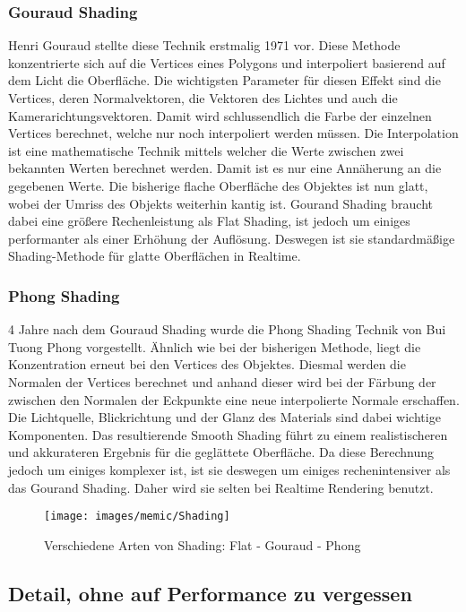 \subsubsection{Gouraud Shading}

Henri Gouraud stellte diese Technik erstmalig 1971 vor. Diese Methode konzentrierte sich auf die Vertices eines Polygons und interpoliert basierend auf dem Licht die Oberfläche. Die wichtigsten Parameter für diesen Effekt sind die Vertices, deren Normalvektoren, die Vektoren des Lichtes und auch die Kamerarichtungsvektoren. Damit wird schlussendlich die Farbe der einzelnen Vertices berechnet, welche nur noch interpoliert werden müssen. Die Interpolation ist eine mathematische Technik mittels welcher die Werte zwischen zwei bekannten Werten berechnet werden. Damit ist es nur eine Annäherung an die gegebenen Werte. Die bisherige flache Oberfläche des Objektes ist nun glatt, wobei der Umriss des Objekts weiterhin kantig ist. Gourand Shading braucht dabei eine größere Rechenleistung als Flat Shading, ist jedoch um einiges performanter als einer Erhöhung der Auflösung. Deswegen ist sie standardmäßige Shading-Methode für glatte Oberflächen in Realtime.

\subsubsection{Phong Shading}

4 Jahre nach dem Gouraud Shading wurde die Phong Shading Technik von Bui Tuong Phong vorgestellt. Ähnlich wie bei der bisherigen Methode, liegt die Konzentration erneut bei den Vertices des Objektes. Diesmal werden die Normalen der Vertices berechnet und anhand dieser wird bei der Färbung der zwischen den Normalen der Eckpunkte eine neue interpolierte Normale erschaffen. Die Lichtquelle, Blickrichtung und der Glanz des Materials sind dabei wichtige Komponenten. Das resultierende Smooth Shading führt zu einem realistischeren und akkurateren Ergebnis für die geglättete Oberfläche. Da diese Berechnung jedoch um einiges komplexer ist, ist sie deswegen um einiges rechenintensiver als das Gourand Shading. Daher wird sie selten bei Realtime Rendering benutzt.

\begin{figure}[H]
	\centering
	\texttt{[image: images/memic/Shading]}
	\caption{Verschiedene Arten von Shading: Flat - Gouraud - Phong}
	\end{figure}
\cite{_different_types_of_shading}

\subsection{Detail, ohne auf Performance zu vergessen}

